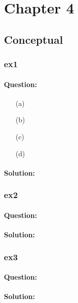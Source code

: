 \documentclass[a4paper,12pt,titlepage]{article} %
\begin{document}
\newpage
\section{Chapter 4}
\subsection{Conceptual}
\subsubsection{ex1}
\paragraph{Question:} 

\begin{itemize}
	\item[(a)]
	\item[(b)]
	\item[(c)]
	\item[(d)]
\end{itemize}

\paragraph{Solution:}

\subsubsection{ex2}
\paragraph{Question:}

\paragraph{Solution:}

\subsubsection{ex3}
\paragraph{Question:}

\paragraph{Solution:}
\end{document}
